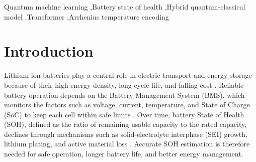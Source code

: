 \documentclass[a4paper,fleqn]{cas-sc}
\begin{document}

\begin{keywords}
Quantum machine learning \sep Battery state of health \sep Hybrid quantum-classical model \sep Transformer \sep Arrhenius temperature encoding
\end{keywords}

\maketitle

\section{Introduction}\label{sec:intro}

Lithium-ion batteries play a central role in electric transport and energy storage because of their high energy density, long cycle life, and falling cost \citep{ralls2023role}. Reliable battery operation depends on the Battery Management System (BMS), which monitors the factors such as voltage, current, temperature, and State of Charge (SoC) to keep each cell within safe limits \citep{ali2025comprehensive}. Over time, battery State of Health (SOH), defined as the ratio of remaining usable capacity to the rated capacity, declines through mechanisms such as solid-electrolyte interphase (SEI) growth, lithium plating, and active material loss \citep{li2025deep}. Accurate SOH estimation is therefore needed for safe operation, longer battery life, and better energy management.
\end{document}
